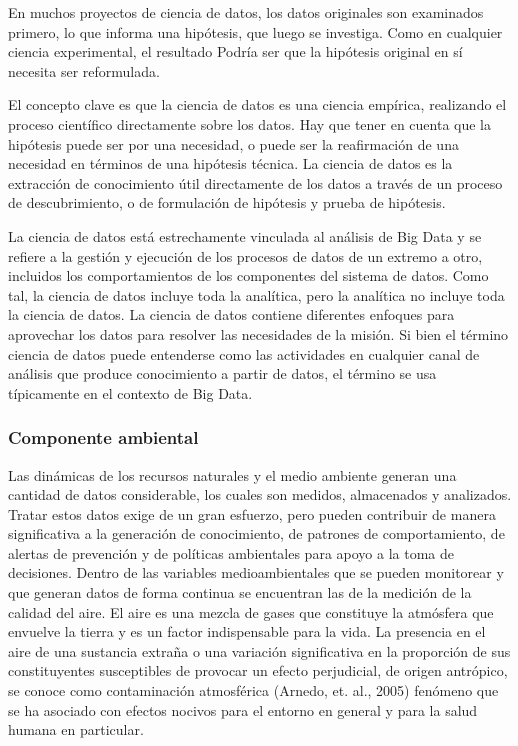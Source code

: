En muchos proyectos de ciencia de datos, los datos originales son examinados primero, lo que informa una hipótesis, que luego se investiga. Como en cualquier ciencia experimental, el resultado
Podría ser que la hipótesis original en sí necesita ser reformulada. 

El concepto clave es que la ciencia de datos es una ciencia empírica, realizando el proceso científico directamente sobre los datos. Hay que tener en cuenta que la hipótesis puede ser por una necesidad, o puede ser la reafirmación de una necesidad en términos de una hipótesis técnica.
La ciencia de datos es la extracción de conocimiento útil directamente de los datos a través de un proceso de descubrimiento, o de formulación de hipótesis y prueba de hipótesis.

La ciencia de datos está estrechamente vinculada al análisis de Big Data y se refiere a la gestión y ejecución de los procesos de datos de un extremo a otro, incluidos los comportamientos de los componentes del sistema de datos. Como tal, la ciencia de datos
incluye toda la analítica, pero la analítica no incluye toda la ciencia de datos. La ciencia de datos contiene diferentes enfoques para aprovechar los datos para resolver las necesidades de la misión. Si bien el término ciencia de datos puede entenderse como las actividades en cualquier canal de análisis que produce conocimiento a partir de datos, el término se usa típicamente en el contexto de Big Data.

\subsubsection{Componente ambiental}

Las dinámicas de los recursos naturales y el medio ambiente generan una cantidad de datos considerable, los cuales son medidos, almacenados y analizados. Tratar estos datos exige de un gran esfuerzo, pero pueden contribuir de manera significativa a la generación de conocimiento, de patrones de comportamiento, de alertas de prevención y de políticas ambientales para apoyo a la toma de decisiones.
Dentro de las variables medioambientales que se pueden monitorear y que generan datos de forma continua se encuentran las de la medición de la calidad del aire.
El aire es una mezcla de gases que constituye la atmósfera que envuelve la tierra y es un factor indispensable para la vida. La presencia en el aire de una sustancia extraña o una variación significativa en la proporción de sus constituyentes susceptibles de provocar un efecto perjudicial, de origen antrópico, se conoce como contaminación atmosférica (Arnedo, et. al., 2005) fenómeno que se ha asociado con efectos nocivos para el entorno en general y para la salud humana en particular.

